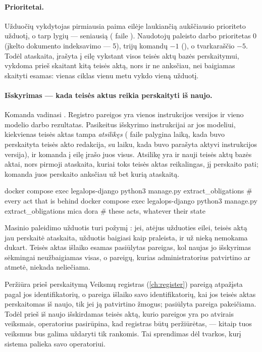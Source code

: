 \paragraph{Prioritetai.} Užduočių vykdytojas pirmiausia paima eilėje laukiančią aukščiausio
prioriteto užduotį, o tarp lygių --- seniausią ( faile ).
Naudotojų paleisto darbo prioritetas 0 (įkelto dokumento indeksavimo --- 5), trijų komandų $-1$
(), o tvarkaraščio $-5$. Todėl ataskaita, įrašyta į eilę vykstant visos teisės aktų
bazės perskaitymui, vykdoma prieš skaitant kitą teisės aktą, nors ir ne anksčiau, nei baigiamas
skaityti esamas: vienas ciklas vienu metu vykdo vieną užduotį.

\paragraph{Išskyrimas --- kada teisės aktus reikia perskaityti iš naujo.} Komanda vadinasi
. Registro pareigos yra vienos instrukcijos versijos ir vieno modelio
darbo rezultatas. Pasikeitus išskyrimo instrukcijai ar jos modeliui, kiekvienas teisės aktas tampa
\emph{atsilikęs} ( faile  palygina laiką, kada buvo
perskaityta teisės akto redakcija, su laiku, kada buvo parašyta aktyvi instrukcijos versija), ir
komanda į eilę įrašo juos visus. Atsilikę yra ir nauji teisės aktų bazės aktai, nors pirmoji
ataskaita, kuriai toks teisės aktas reikalingas, jį perskaito pati; komanda juos perskaito
anksčiau už bet kurią ataskaitą.

\begin{codeblock}
docker compose exec legalops-django python3 manage.py extract_obligations             # every act that is behind
docker compose exec legalops-django python3 manage.py extract_obligations mica dora   # these acts, whatever their state
\end{codeblock}

Masinio paleidimo užduotis turi požymį : jei, atėjus užduoties eilei, teisės aktą
jau perskaitė ataskaita, užduotis baigiasi kaip praleista, ir už nieką nemokama dukart. Teisės
aktas išlaiko esamas pasiūlytas pareigas, kol naujas jo išskyrimas sėkmingai neužbaigiamas visas, o
pareigų, kurias administratorius patvirtino ar atmetė, niekada neliečiama.

\begin{humanbox}{Peržiūra prieš perskaitymą}
Veiksmų registras (\cref{ch:register}) pareigą atpažįsta pagal jos identifikatorių, o pareiga
išlaiko savo identifikatorių, kai jos teisės aktas perskaitomas iš naujo, tik jei ją patvirtino
žmogus; pasiūlyta pareiga pakeičiama. Todėl prieš iš naujo išskirdamas teisės aktą, kurio pareigos
yra po atvirais veiksmais, operatorius pasirūpina, kad registras būtų peržiūrėtas, --- kitaip tuos
veiksmus bus galima uždaryti tik rankomis. Tai sprendimas dėl tvarkos, kurį sistema palieka savo
operatoriui.
\end{humanbox}


